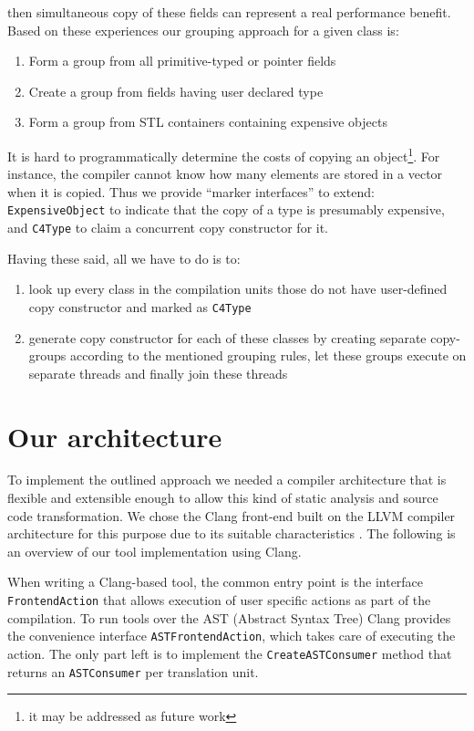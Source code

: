 \documentclass{article}
\begin{document}
then simultaneous copy of these fields can represent a real performance benefit. Based on these experiences our grouping approach for a given class is:
\begin{enumerate}
 \item Form a group from all primitive-typed or pointer fields
 \item Create a group from fields having user declared type
 \item Form a group from STL containers containing expensive objects
\end{enumerate}

It is hard to programmatically determine the costs of copying an object\footnote{it may be addressed as future work}. For instance, the compiler cannot know how many elements are stored in a vector when it is copied. Thus we provide ``marker interfaces'' to extend: \texttt{ExpensiveObject} to indicate that the copy of a type is presumably expensive, and \texttt{C4Type} to claim a concurrent copy constructor for it.

Having these said, all we have to do is to:
\begin{enumerate}
 \item look up every class in the compilation units those do not have user-defined copy constructor and marked as \texttt{C4Type}
 \item generate copy constructor for each of these classes by creating separate copy-groups according to the mentioned grouping rules, let these groups execute on separate threads and finally join these threads
\end{enumerate}

\section{Our architecture}
\label{architecture}

To implement the outlined approach we needed a compiler architecture that is flexible and extensible enough to allow this kind of static analysis and source code transformation. We chose the Clang front-end built on the LLVM compiler architecture for this purpose due to its suitable characteristics \cite{lattner:clang,voufo:clang}. The following is an overview of our tool implementation using Clang.

When writing a Clang-based tool, the common entry point is the interface \texttt{FrontendAction} that allows execution of user specific actions as part of the compilation. To run tools over the AST (Abstract Syntax Tree) Clang provides the convenience interface \texttt{ASTFrontendAction}, which takes care of executing the action. The only part left is to implement the \texttt{CreateASTConsumer} method that returns an \texttt{ASTConsumer} per translation unit.
\end{document}
